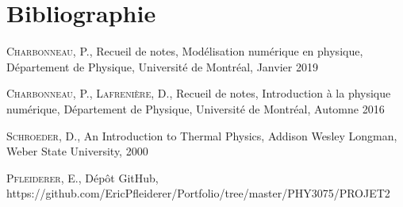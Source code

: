\documentclass{article}
\begin{document}
\section{Bibliographie}\label{sec:bibliographie}
\begin{thebibliography}{l}
	\textsc{Charbonneau}, P., Recueil de notes, Modélisation numérique en physique, Département de Physique, Université de Montréal, Janvier 2019
	
	\textsc{Charbonneau}, P., \textsc{Lafrenière}, D., Recueil de notes, Introduction à la physique numérique, Département de Physique, Université de Montréal, Automne 2016
	
	\textsc{Schroeder}, D.,  An Introduction to Thermal Physics, Addison Wesley Longman, Weber State University, 2000
	
	\textsc{Pfleiderer}, E., Dépôt GitHub, https://github.com/EricPfleiderer/Portfolio/tree/master/PHY3075/PROJET2
\end{thebibliography}
\end{document}
